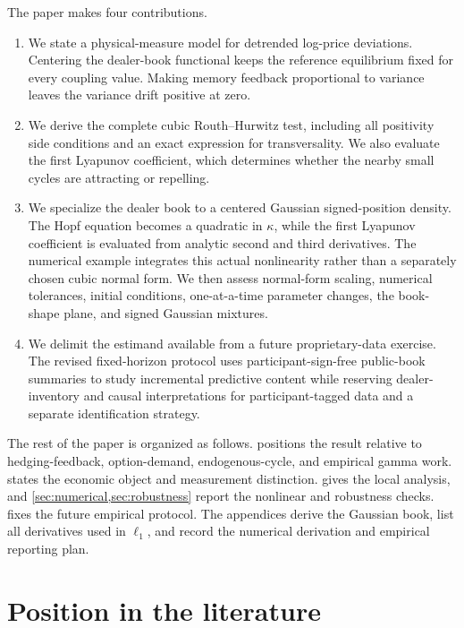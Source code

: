 \documentclass[11pt]{article}
\begin{document}
The paper makes four contributions.
\begin{enumerate}
\item We state a physical-measure model for detrended log-price deviations.  Centering the
dealer-book functional keeps the reference equilibrium fixed for every coupling value.
Making memory feedback proportional to variance leaves the variance drift positive at zero.
\item We derive the complete cubic Routh--Hurwitz test, including all positivity side
conditions and an exact expression for transversality.  We also evaluate the first Lyapunov
coefficient, which determines whether the nearby small cycles are attracting or repelling.
\item We specialize the dealer book to a centered Gaussian signed-position density.  The
Hopf equation becomes a quadratic in $\kappa$, while the first Lyapunov coefficient is
evaluated from analytic second and third derivatives.  The numerical example integrates
this actual nonlinearity rather than a separately chosen cubic normal form.  We then assess
normal-form scaling, numerical tolerances, initial conditions, one-at-a-time parameter
changes, the book-shape plane, and signed Gaussian mixtures.
\item We delimit the estimand available from a future proprietary-data exercise.  The revised
fixed-horizon protocol uses participant-sign-free public-book summaries to study incremental
predictive content while reserving dealer-inventory and causal interpretations for
participant-tagged data and a separate identification strategy.
\end{enumerate}

The rest of the paper is organized as follows.   positions the result
relative to hedging-feedback, option-demand, endogenous-cycle, and empirical gamma work.
 states the economic object and measurement distinction.
 gives the local analysis, and \cref{sec:numerical,sec:robustness} report the
nonlinear and robustness checks.   fixes the future empirical protocol.
The appendices derive the Gaussian book, list all derivatives used in $\ell_1$, and record
the numerical derivation and empirical reporting plan.

\section{Position in the literature}
\label{sec:related}
\end{document}
